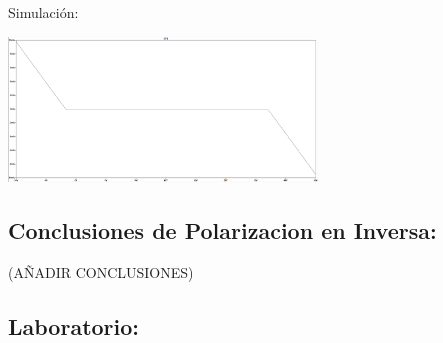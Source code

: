 \vspace{0.5cm}

Simulación:

\includegraphics[width=8.2cm]{imagenes/simulacion4.png}\\

\subsection{Conclusiones de Polarizacion en Inversa:}
(AÑADIR CONCLUSIONES)


\subsection{Laboratorio:}
 